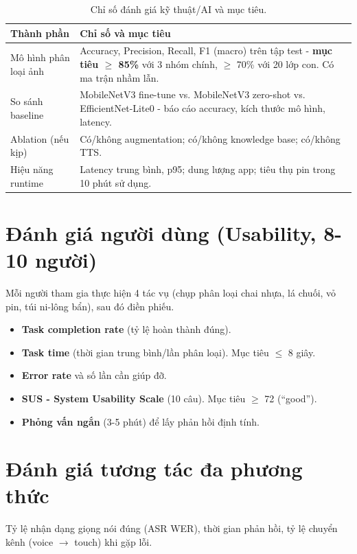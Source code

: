 \documentclass[13pt,a4paper,oneside]{report}
\begin{document}
\begin{table}[h!]
\centering
\caption{Chỉ số đánh giá kỹ thuật/AI và mục tiêu.}
\label{tab:eval-ai}
\small
\begin{tabularx}{\linewidth}{@{} l Y @{}}
\toprule
\textbf{Thành phần} & \textbf{Chỉ số và mục tiêu} \\
\midrule
Mô hình phân loại ảnh & Accuracy, Precision, Recall, F1 (macro) trên tập test - \textbf{mục tiêu $\geq$ 85\%} với 3 nhóm chính, $\geq$ 70\% với 20 lớp con. Có ma trận nhầm lẫn. \\
So sánh baseline & MobileNetV3 fine-tune vs. MobileNetV3 zero-shot vs. EfficientNet-Lite0 - báo cáo accuracy, kích thước mô hình, latency. \\
Ablation (nếu kịp) & Có/không augmentation; có/không knowledge base; có/không TTS. \\
Hiệu năng runtime & Latency trung bình, p95; dung lượng app; tiêu thụ pin trong 10 phút sử dụng. \\
\bottomrule
\end{tabularx}
\end{table}

\section{Đánh giá người dùng (Usability, 8-10 người)}

Mỗi người tham gia thực hiện 4 tác vụ (chụp phân loại chai nhựa, lá chuối, vỏ pin, túi ni-lông bẩn), sau đó điền phiếu.

\begin{itemize}[leftmargin=1.5cm]
    \item \textbf{Task completion rate} (tỷ lệ hoàn thành đúng).
    \item \textbf{Task time} (thời gian trung bình/lần phân loại). Mục tiêu $\leq$ 8 giây.
    \item \textbf{Error rate} và số lần cần giúp đỡ.
    \item \textbf{SUS - System Usability Scale} (10 câu). Mục tiêu $\geq$ 72 (``good'').
    \item \textbf{Phỏng vấn ngắn} (3-5 phút) để lấy phản hồi định tính.
\end{itemize}

\section{Đánh giá tương tác đa phương thức}

Tỷ lệ nhận dạng giọng nói đúng (ASR WER), thời gian phản hồi, tỷ lệ chuyển kênh (voice $\rightarrow$ touch) khi gặp lỗi.
\end{document}
